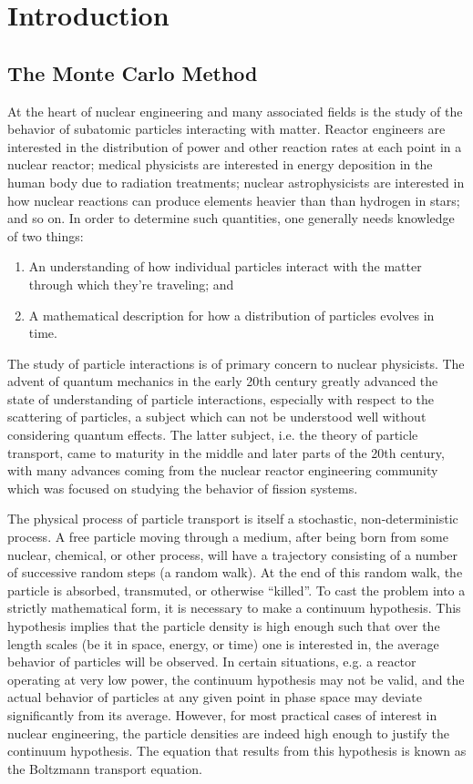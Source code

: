 \chapter{Introduction}
\label{chap:intro}

\section{The Monte Carlo Method}

At the heart of nuclear engineering and many associated fields is the study of
the behavior of subatomic particles interacting with matter. Reactor engineers
are interested in the distribution of power and other reaction rates at each
point in a nuclear reactor; medical physicists are interested in energy
deposition in the human body due to radiation treatments; nuclear
astrophysicists are interested in how nuclear reactions can produce elements
heavier than than hydrogen in stars; and so on. In order to determine such
quantities, one generally needs knowledge of two things:
\begin{enumerate}
\item An understanding of how individual particles interact with the matter
  through which they're traveling; and
\item A mathematical description for how a distribution of particles evolves in
  time.
\end{enumerate}
The study of particle interactions is of primary concern to nuclear
physicists. The advent of quantum mechanics in the early 20th century greatly
advanced the state of understanding of particle interactions, especially with
respect to the scattering of particles, a subject which can not be understood
well without considering quantum effects. The latter subject, i.e. the theory of
particle transport, came to maturity in the middle and later parts of the 20th
century, with many advances coming from the nuclear reactor engineering
community which was focused on studying the behavior of fission systems.

The physical process of particle transport is itself a stochastic,
non-deterministic process. A free particle moving through a medium, after being
born from some nuclear, chemical, or other process, will have a trajectory
consisting of a number of successive random steps (a random walk). At the end of
this random walk, the particle is absorbed, transmuted, or otherwise ``killed''.
To cast the problem into a strictly mathematical form, it is necessary to make a
continuum hypothesis. This hypothesis implies that the particle density is high
enough such that over the length scales (be it in space, energy, or time) one is
interested in, the average behavior of particles will be observed. In certain
situations, e.g. a reactor operating at very low power, the continuum hypothesis
may not be valid, and the actual behavior of particles at any given point in
phase space may deviate significantly from its average. However, for most
practical cases of interest in nuclear engineering, the particle densities are
indeed high enough to justify the continuum hypothesis. The equation that
results from this hypothesis is known as the Boltzmann transport equation.

